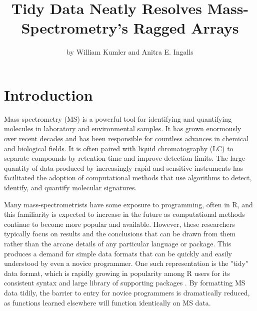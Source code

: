 
\title{Tidy Data Neatly Resolves Mass-Spectrometry's Ragged Arrays}
\author{by William Kumler and Anitra E. Ingalls}

\maketitle


\section{Introduction}

Mass-spectrometry (MS) is a powerful tool for identifying and quantifying molecules in laboratory and environmental samples. It has grown enormously over recent decades and has been responsible for countless advances in chemical and biological fields. It is often paired with liquid chromatography (LC) to separate compounds by retention time and improve detection limits. The large quantity of data produced by increasingly rapid and sensitive instruments has facilitated the adoption of computational methods that use algorithms to detect, identify, and quantify molecular signatures.

Many mass-spectrometrists have some exposure to programming, often in R, and this familiarity is expected to increase in the future as computational methods continue to become more popular and available. However, these researchers typically focus on results and the conclusions that can be drawn from them rather than the arcane details of any particular language or package. This produces a demand for simple data formats that can be quickly and easily understood by even a novice programmer. One such representation is the "tidy" data format, which is rapidly growing in popularity among R users for its consistent syntax and large library of supporting packages \citep{wickham2014}. By formatting MS data tidily, the barrier to entry for novice programmers is dramatically reduced, as  functions learned elsewhere will function identically on MS data.

